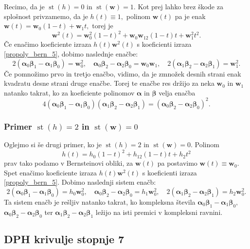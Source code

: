 \documentclass[12pt,a4paper,twoside]{article}
\theoremstyle{definition} %
\theoremstyle{plain} %
\theoremstyle{primerstyle}
\numberwithin{equation}{section}  %
\newcommand{\wV}{\mathbf{w}}
\newcommand{\balpha}{\boldsymbol \alpha}
\newcommand{\bbeta}{\boldsymbol \beta}
\DeclareMathOperator{\st}{st}
\begin{document}
Recimo, da je $\st(h)=0$ in $\st(\wV)=1.$ Kot prej lahko brez škode za splošnost privzamemo, da je $h(t)\equiv1,$ polinom $\wV(t)$ pa je enak $\wV(t)=\wV_0(1-t)+\wV_1t,$ torej je $$\wV^2(t)=\wV_0^2(1-t)^2+\wV_0\wV_12(1-t)t+\wV_1^2t^2.$$ Če enačimo koeficiente izraza $h(t)\wV^2(t)$ s koeficienti izraza \eqref{propoly_bern_5}, dobimo naslednje enačbe:
\begin{equation}
	2(\balpha_0\bbeta_1-\balpha_1\bbeta_0)=\wV_0^2,\quad \balpha_0\bbeta_2-\balpha_2\bbeta_0=\wV_0\wV_1,\quad 2(\balpha_1\bbeta_2-\balpha_2\bbeta_1)=\wV_1^2.
\end{equation}
Če pomnožimo prvo in tretjo enačbo, vidimo, da je zmnožek desnih strani enak kvadratu desne strani druge enačbe. Torej te enačbe res držijo za neka $\wV_0$ in $\wV_1$ natanko takrat, ko za koeficiente polinomov $\balpha$ in $\bbeta$ velja enačba
\begin{equation}
	\label{st5h0w1}
	4(\balpha_0\bbeta_1-\balpha_1\bbeta_0)(\balpha_1\bbeta_2-\balpha_2\bbeta_1)=(\balpha_0\bbeta_2-\balpha_2\bbeta_0)^2.
\end{equation}

\subsubsection{Primer \texorpdfstring{$\st(h)=2$}{st(h)=2} in \texorpdfstring{$\st(\wV)=0$}{st(w)=0}}

Oglejmo si še drugi primer, ko je $\st(h)=2$ in $\st(\wV)=0.$ Polinom $$h(t)=h_0(1-t)^2+h_12(1-t)t+h_2t^2$$ prav tako podamo v Bernsteinovi obliki, za $\wV(t)$ pa postavimo $\wV(t)\equiv\wV_0.$ Spet enačimo koeficiente izraza $h(t)\wV^2(t)$ s koeficienti izraza \eqref{propoly_bern_5}. Dobimo naslednji sistem enačb:
\begin{equation}
	2(\balpha_0\bbeta_1-\balpha_1\bbeta_0)=h_0\wV_0^2,\quad \balpha_0\bbeta_2-\balpha_2\bbeta_0=h_1\wV_0^2,\quad 2(\balpha_1\bbeta_2-\balpha_2\bbeta_1)=h_2\wV_0^2.\label{st5h2w0}
\end{equation}
Ta sistem enačb je rešljiv natanko takrat, ko kompleksna števila $\balpha_0\bbeta_1-\balpha_1\bbeta_0,$ $\balpha_0\bbeta_2-\balpha_2\bbeta_0$ ter $\balpha_1\bbeta_2-\balpha_2\bbeta_1$ ležijo na isti premici v kompleksni ravnini.

\subsection{DPH krivulje stopnje 7}
\label{poglavje_dvojnePHkrivulje7}
\end{document}
